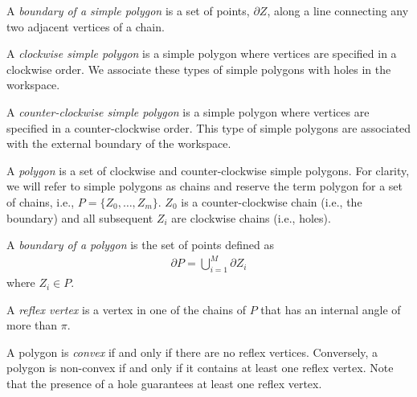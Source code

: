 \documentclass[../main.tex]{subfiles}
\begin{document}
\begin{definition}
A \emph{boundary of a simple polygon} is a set of points, $\partial Z$, along a line connecting any two adjacent vertices of a chain. 
\end{definition}

\begin{definition}
A \emph{clockwise simple polygon} is a simple polygon where vertices are specified in a clockwise order. We associate these types of simple polygons with holes in the workspace. 
\end{definition}

\begin{definition}
A \emph{counter-clockwise simple polygon} is a simple polygon where vertices are specified in a counter-clockwise order. This type of simple polygons are associated with the external boundary of the workspace.
\end{definition}

\begin{definition}[Polygon]
A \emph{polygon} is a set of clockwise and counter-clockwise simple polygons. For clarity, we will refer to simple polygons as chains and reserve the term polygon for a set of chains, i.e., $P=\{Z_0,\ldots,Z_m\}$. $Z_0$ is a counter-clockwise chain (i.e., the boundary) and all subsequent $Z_i$ are clockwise chains (i.e., holes). 
\end{definition}

\begin{definition}
A \emph{boundary of a polygon} is the set of points defined as
	\begin{equation}
	\begin{aligned}
 		\partial P=\bigcup^M_{i=1}\partial Z_i
	\end{aligned}
	\end{equation}
where $Z_i\in P$.
\end{definition}

\begin{definition}
A \emph{reflex vertex} is a vertex in one of the chains of $P$ that has an internal angle of more than $\pi$.
\end{definition}

\begin{definition}
A polygon is \emph{convex} if and only if there are no reflex vertices. Conversely, a polygon is non-convex if and only if it contains at least one reflex vertex. Note that the presence of a hole guarantees at least one reflex vertex.
\end{definition}
\end{document}
